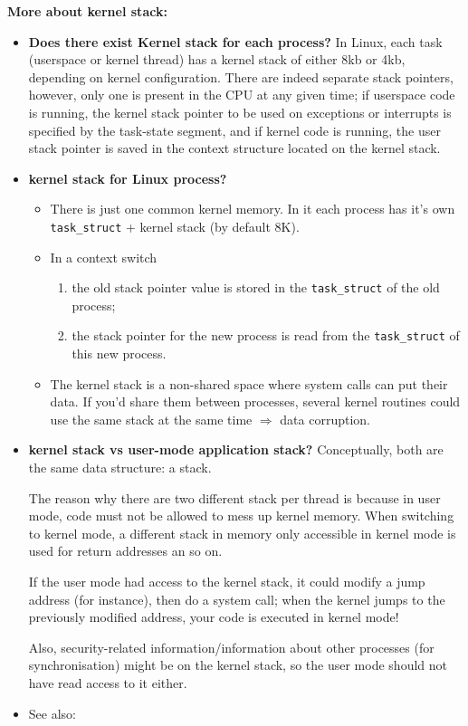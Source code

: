 \textbf{More about kernel stack:}
\begin{itemize}
\item \textbf{Does there exist Kernel stack for each process?}  In
  Linux, each task (userspace or kernel thread) has a kernel stack of either 8kb or 4kb,
  depending on kernel configuration. There are indeed separate stack pointers, however,
  only one is present in the CPU at any given time; if userspace code is running, the
  kernel stack pointer to be used on exceptions or interrupts is specified by the
  task-state segment, and if kernel code is running, the user stack pointer is saved in
  the context structure located on the kernel stack.
\item \textbf{kernel stack for Linux process?} 
  \begin{itemize}
  \item There is just one common kernel memory. In it each process has it's own
    \texttt{task\_struct} + kernel stack (by default 8K).
  \item In a context switch
    \begin{enumerate}
    \item the old stack pointer value is stored in the \texttt{task\_struct} of the old
      process;
    \item the stack pointer for the new process is read from the \texttt{task\_struct} of
      this new process.
    \end{enumerate}
  \item The kernel stack is a non-shared space where system calls can put their data. If
    you'd share them between processes, several kernel routines could use the same stack
    at the same time $\Rightarrow$ data corruption.
  \end{itemize}
\item \textbf{kernel stack vs user-mode application
    stack?}   Conceptually, both are
  the same data structure: a stack.

  The reason why there are two different stack per thread is because in user mode, code
  must not be allowed to mess up kernel memory. When switching to kernel mode, a different
  stack in memory only accessible in kernel mode is used for return addresses an so on.

  If the user mode had access to the kernel stack, it could modify a jump address (for
  instance), then do a system call; when the kernel jumps to the previously modified
  address, your code is executed in kernel mode!

  Also, security-related information/information about other processes (for
  synchronisation) might be on the kernel stack, so the user mode should not have read
  access to it either.
\item See also: 
\end{itemize}

